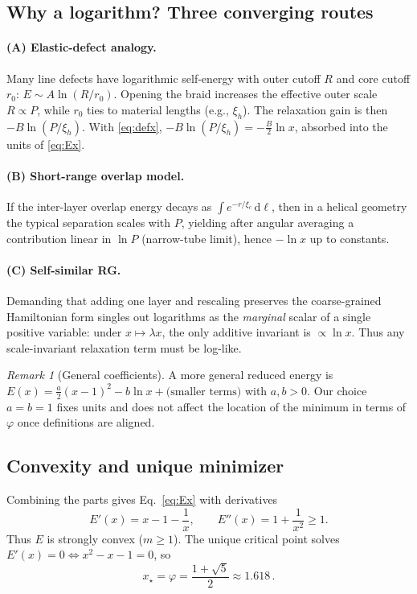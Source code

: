 \documentclass[11pt]{article}
\theoremstyle{remark}
\newtheorem{remark}{Remark}
\theoremstyle{definition}
\newcommand{\ph}{\varphi}
\begin{document}
\subsection{Why a logarithm? Three converging routes}
\paragraph{(A) Elastic-defect analogy.} Many line defects have logarithmic self-energy with outer cutoff $R$ and core cutoff $r_0$: $E\sim A\ln(R/r_0)$. Opening the braid increases the effective outer scale $R\propto P$, while $r_0$ ties to material lengths (e.g., $\xi_h$). The relaxation gain is then $-B\ln(P/\xi_h)$. With \eqref{eq:defx}, $-B\ln(P/\xi_h)=-\tfrac{B}{2}\ln x$, absorbed into the units of \eqref{eq:Ex}.

\paragraph{(B) Short-range overlap model.} If the inter-layer overlap energy decays as $\int e^{-r/\xi_c}\,\mathrm d\ell$, then in a helical geometry the typical separation scales with $P$, yielding after angular averaging a contribution linear in $\ln P$ (narrow-tube limit), hence $-\ln x$ up to constants.

\paragraph{(C) Self-similar RG.} Demanding that adding one layer and rescaling preserves the coarse-grained Hamiltonian form singles out logarithms as the \emph{marginal} scalar of a single positive variable: under $x\mapsto \lambda x$, the only additive invariant is $\propto \ln x$. Thus any scale-invariant relaxation term must be log-like.

\begin{remark}[General coefficients]
A more general reduced energy is $E(x)=\tfrac{a}{2}(x-1)^2-b\ln x+\text{(smaller terms)}$ with $a,b>0$. Our choice $a=b=1$ fixes units and does not affect the location of the minimum in terms of $\ph$ once definitions are aligned.
\end{remark}

\subsection{Convexity and unique minimizer}
Combining the parts gives Eq.~\eqref{eq:Ex} with derivatives
\begin{equation}
 E'(x)=x-1-\frac{1}{x},\qquad E''(x)=1+\frac{1}{x^2}\ge1.
\end{equation}
Thus $E$ is strongly convex ($m\ge1$). The unique critical point solves $E'(x)=0\iff x^2-x-1=0$, so
\begin{equation}
 x_\star=\ph=\frac{1+\sqrt5}{2} \approx 1.618\,.
\end{equation}
\end{document}
